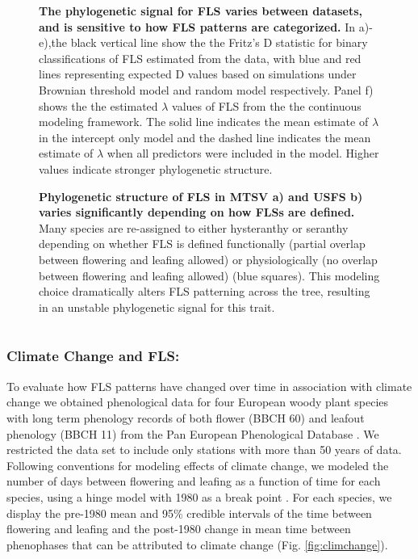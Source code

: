 \documentclass[11pt]{article}\usepackage[]{graphicx}\usepackage[]{color}
\begin{document}
\begin{figure}[H]
\centering

  \caption{\textbf{The phylogenetic signal for FLS varies between datasets, and is sensitive to how FLS patterns are categorized.} In a)-e),the black vertical line show the the Fritz's D statistic for binary classifications of FLS estimated from the data, with blue and red lines representing expected D values based on simulations under Brownian threshold model and random model respectively. Panel f) shows the the estimated $\lambda$ values of FLS from the the continuous modeling framework. The solid line indicates the mean estimate of $\lambda$ in the intercept only model and the dashed line indicates the mean estimate of $\lambda$ when all predictors were included in the model. Higher values indicate stronger phylogenetic structure.}
    \label{fig:Dstat}
    \end{figure}

\begin{figure}[H]
\centering

  \caption{\textbf{Phylogenetic structure of FLS in MTSV \textbf{a)} and USFS \textbf{b)} varies significantly depending on how FLSs are defined.} Many species are re-assigned to either hysteranthy or seranthy depending on whether FLS is defined functionally (partial overlap between flowering and leafing allowed) or physiologically (no overlap between flowering and leafing allowed) (blue squares). This modeling choice dramatically alters FLS patterning across the tree, resulting in an unstable phylogenetic signal for this trait.}
    \label{fig:phylogeny}
    \end{figure}

\pagebreak[4]


\section*{}\label{Methods S1}

\subsubsection*{Climate Change and FLS:}
To evaluate how FLS patterns have changed over time in association with climate change we obtained phenological data for four European woody plant species with long term phenology records of both flower (BBCH 60) and leafout phenology (BBCH 11) from the Pan European Phenological Database \citep{PEP725}. We restricted the data set to include only stations with more than 50 years of data. Following conventions for modeling effects of climate change, we modeled the number of days between flowering and leafing as a function of time for each species, using a hinge model with 1980 as a break point \citep{IPCC2013,Kharouba2018}. For each species, we display the pre-1980 mean and 95\% credible intervals of the time between flowering and leafing and the post-1980 change in mean time between phenophases that can be  attributed to climate change (Fig. \ref{fig:climchange}).
\end{document}
